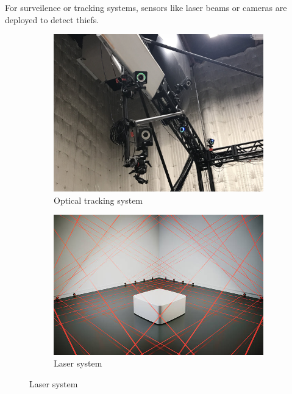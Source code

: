 For surveilence or tracking systems, 
sensors like laser beams or cameras are deployed to detect thiefs. 
\begin{figure}[ht] 
    \centering 
    
    \begin{subfigure}[b]{0.41\textwidth} 
        \includegraphics[width=\textwidth]{figures/optitrack.jpg} 
        \caption{Optical tracking system} 
        \label{fig:intro_optitrack} 
    \end{subfigure} 
    \hfill
    \begin{subfigure} [b]{0.46\textwidth} 
        \includegraphics[width=\textwidth]{figures/laser.jpg} 
        \caption{Laser system} 
        \label{fig:intro_laser} 
    \end{subfigure} 
\end{figure} 


